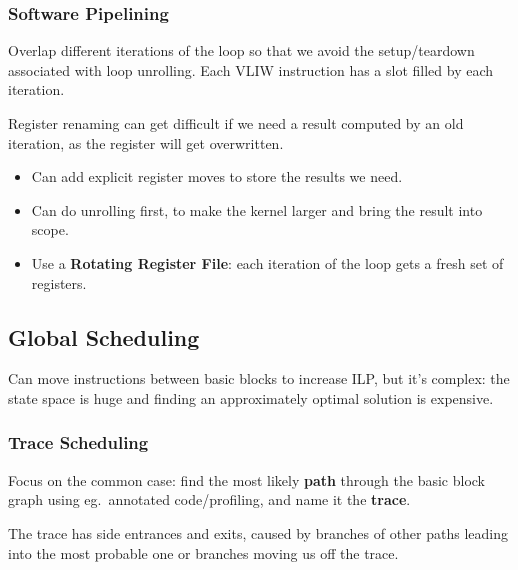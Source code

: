 \documentclass[11pt]{article}
\begin{document}
{{        \subsubsection*{Software Pipelining}
        {
            Overlap different iterations of the loop so that we avoid the setup/teardown associated with loop unrolling. Each VLIW instruction has a slot filled by each iteration.

            Register renaming can get difficult if we need a result computed by an old iteration, as the register will get overwritten.

            \begin{itemize}
            \item Can add explicit register moves to store the results we need.
            \item Can do unrolling first, to make the kernel larger and bring the result into scope.
            \item Use a \textbf{Rotating Register File}: each iteration of the loop gets a fresh set of registers.
            \end{itemize}
        }
    }
    \subsection*{Global Scheduling}
    {
        Can move instructions between basic blocks to increase ILP, but it's complex: the state space is huge and finding an approximately optimal solution is expensive.

        \subsubsection*{Trace Scheduling}
        {
            \begin{minipage}[t]{0.55\textwidth}
            Focus on the common case: find the most likely \textbf{path} through the basic block graph using eg.\ annotated code/profiling, and name it the \textbf{trace}.

            The trace has side entrances and exits, caused by branches of other paths leading into the most probable one or branches moving us off the trace.


\end{minipage}}}}
\end{document}

